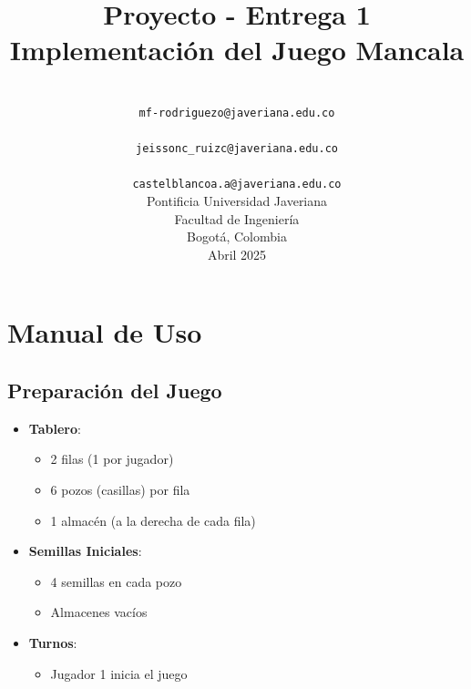 \documentclass{article}
\title{
    \vspace*{3cm}
    \textbf{Proyecto - Entrega 1}\\
    \large Implementación del Juego Mancala
}
\author{
    \text{María Fernanda Rodríguez Ospina} \\
    \small\texttt{mf-rodriguezo@javeriana.edu.co}
    \vspace{3mm}
    \\
    \text{Jeisson Camilo Ruiz Cristancho} \\
    \small\texttt{jeissonc\_ruizc@javeriana.edu.co}
    \vspace{3mm}
    \\
    \text{Alejandro Castelblanco Arias} \\
    \small\texttt{castelblancoa.a@javeriana.edu.co}
    \vspace{1cm}
    \\
    \large Pontificia Universidad Javeriana \\
    \small Facultad de Ingeniería \\
    \small Bogotá, Colombia \\
    \small Abril 2025
}
\date{}
\begin{document}
\maketitle
\thispagestyle{empty}
\clearpage



\section{Manual de Uso}

\subsection{Preparación del Juego}
\begin{itemize}
    \item \textbf{Tablero}:
    \begin{itemize}
        \item 2 filas (1 por jugador)
        \item 6 pozos (casillas) por fila
        \item 1 almacén (a la derecha de cada fila)
    \end{itemize}
    
    \item \textbf{Semillas Iniciales}:
    \begin{itemize}
        \item 4 semillas en cada pozo
        \item Almacenes vacíos
    \end{itemize}
    
    \item \textbf{Turnos}:
    \begin{itemize}
        \item Jugador 1 inicia el juego
    \end{itemize}
\end{itemize}
\end{document}
